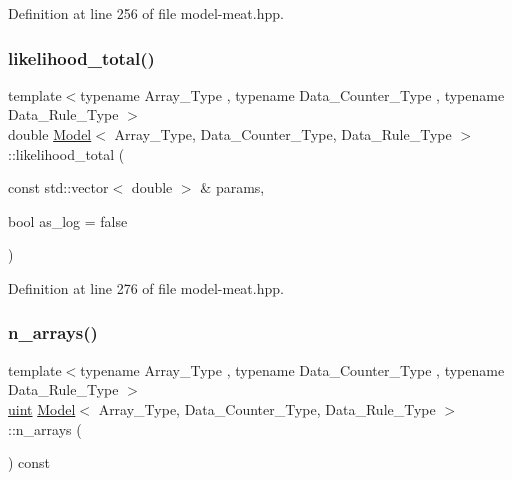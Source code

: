 Definition at line 256 of file model-\/meat.\+hpp.

\mbox{\label{class_model_a31d16ef478d772cedde0813575074a0f}} 
\subsubsection{\texorpdfstring{likelihood\+\_\+total()}{likelihood\_total()}}
{\footnotesize\ttfamily template$<$typename Array\+\_\+\+Type , typename Data\+\_\+\+Counter\+\_\+\+Type , typename Data\+\_\+\+Rule\+\_\+\+Type $>$ \\
double \hyperlink{class_model}{Model}$<$ Array\+\_\+\+Type, Data\+\_\+\+Counter\+\_\+\+Type, Data\+\_\+\+Rule\+\_\+\+Type $>$\+::likelihood\+\_\+total (\begin{DoxyParamCaption}\item[{const std\+::vector$<$ double $>$ \&}]{params,  }\item[{bool}]{as\+\_\+log = {\ttfamily false} }\end{DoxyParamCaption})\hspace{0.3cm}{\ttfamily [inline]}}



Definition at line 276 of file model-\/meat.\+hpp.

\mbox{\label{class_model_ac3a9ef28d8b6b1e4dfae85816b111080}} 
\subsubsection{\texorpdfstring{n\+\_\+arrays()}{n\_arrays()}}
{\footnotesize\ttfamily template$<$typename Array\+\_\+\+Type , typename Data\+\_\+\+Counter\+\_\+\+Type , typename Data\+\_\+\+Rule\+\_\+\+Type $>$ \\
\hyperlink{typedefs_8hpp_a91ad9478d81a7aaf2593e8d9c3d06a14}{uint} \hyperlink{class_model}{Model}$<$ Array\+\_\+\+Type, Data\+\_\+\+Counter\+\_\+\+Type, Data\+\_\+\+Rule\+\_\+\+Type $>$\+::n\+\_\+arrays (\begin{DoxyParamCaption}{ }\end{DoxyParamCaption}) const\hspace{0.3cm}{\ttfamily [inline]}}



